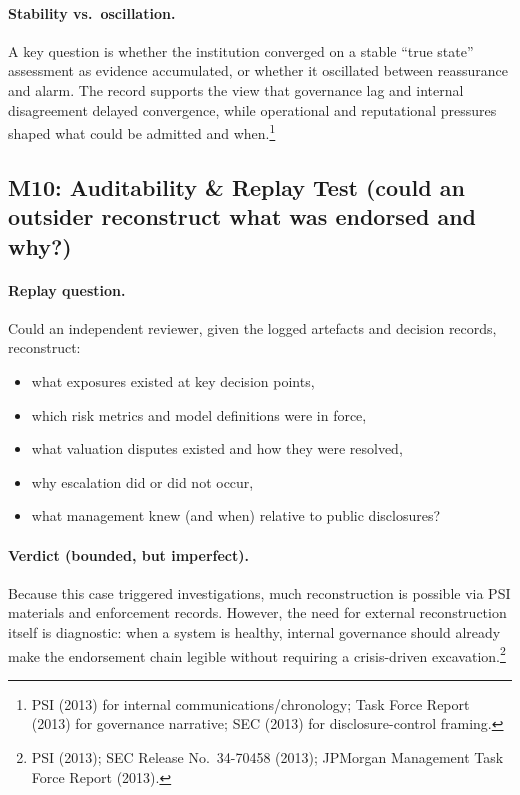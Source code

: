\paragraph{Stability vs.\ oscillation.}
A key question is whether the institution converged on a stable “true state” assessment as evidence accumulated, or whether it oscillated between reassurance and alarm. The record supports the view that governance lag and internal disagreement delayed convergence, while operational and reputational pressures shaped what could be admitted and when.\footnote{PSI (2013) for internal communications/chronology; Task Force Report (2013) for governance narrative; SEC (2013) for disclosure-control framing.}

\subsection{M10: Auditability \& Replay Test (could an outsider reconstruct what was endorsed and why?)}
\label{subsec:lw-m10}

\paragraph{Replay question.}
Could an independent reviewer, given the logged artefacts and decision records, reconstruct:
\begin{itemize}
\item what exposures existed at key decision points,
\item which risk metrics and model definitions were in force,
\item what valuation disputes existed and how they were resolved,
\item why escalation did or did not occur,
\item what management knew (and when) relative to public disclosures?
\end{itemize}

\paragraph{Verdict (bounded, but imperfect).}
Because this case triggered investigations, much reconstruction is possible via PSI materials and enforcement records. However, the need for external reconstruction itself is diagnostic: when a system is healthy, internal governance should already make the endorsement chain legible without requiring a crisis-driven excavation.\footnote{PSI (2013); SEC Release No.\ 34-70458 (2013); JPMorgan Management Task Force Report (2013).}

